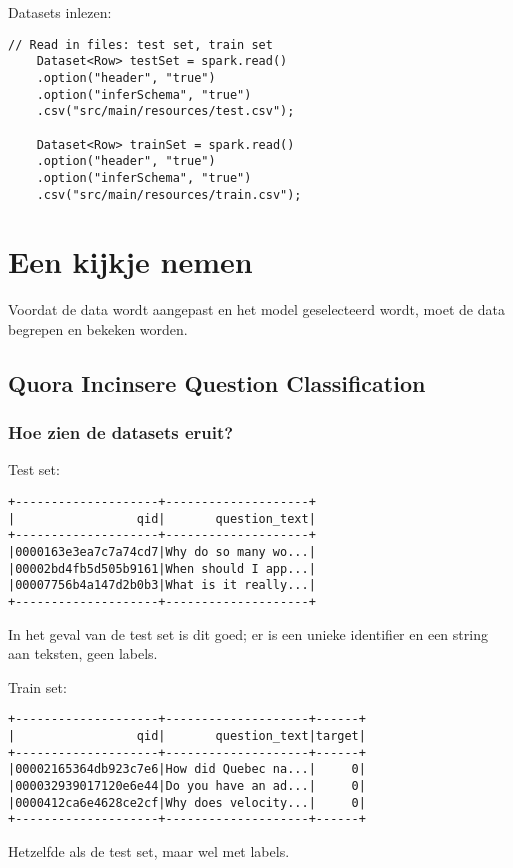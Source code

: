 Datasets inlezen:
\begin{lstlisting}[style=codeStyle]
// Read in files: test set, train set
    Dataset<Row> testSet = spark.read()
    .option("header", "true")
    .option("inferSchema", "true")
    .csv("src/main/resources/test.csv");
    
    Dataset<Row> trainSet = spark.read()
    .option("header", "true")
    .option("inferSchema", "true")
    .csv("src/main/resources/train.csv");
\end{lstlisting}

\section{Een kijkje nemen}
\label{sec:taking-a-look}
Voordat de data wordt aangepast en het model geselecteerd wordt, moet de data begrepen en bekeken worden. 

\subsection{Quora Incinsere Question Classification}
 
\subsubsection{Hoe zien de datasets eruit?}

Test set:
\begin{lstlisting}[style=commentStyle]
+--------------------+--------------------+
|                 qid|       question_text|
+--------------------+--------------------+
|0000163e3ea7c7a74cd7|Why do so many wo...|
|00002bd4fb5d505b9161|When should I app...|
|00007756b4a147d2b0b3|What is it really...|
+--------------------+--------------------+

\end{lstlisting}
In het geval van de test set is dit goed; er is een unieke identifier en een string aan teksten, geen labels.


Train set:
\begin{lstlisting}[style=commentStyle]
+--------------------+--------------------+------+
|                 qid|       question_text|target|
+--------------------+--------------------+------+
|00002165364db923c7e6|How did Quebec na...|     0|
|000032939017120e6e44|Do you have an ad...|     0|
|0000412ca6e4628ce2cf|Why does velocity...|     0|
+--------------------+--------------------+------+
\end{lstlisting}
Hetzelfde als de test set, maar wel met labels.

